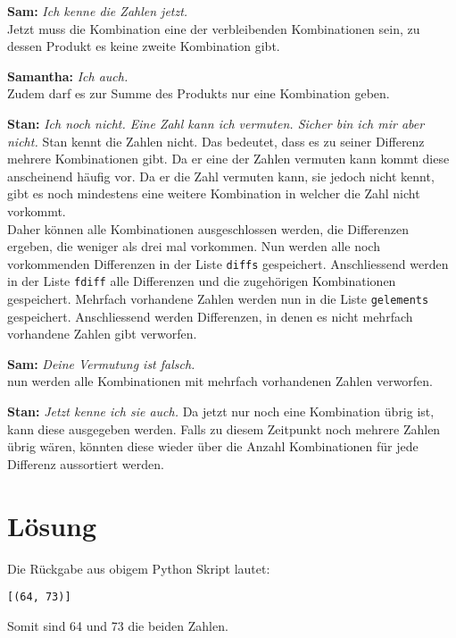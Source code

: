 \documentclass[a4paper, 10pt, fleqn]{article}
\begin{document}
\textbf{Sam: }\emph{Ich kenne die Zahlen jetzt. } \\
Jetzt muss die Kombination eine der verbleibenden Kombinationen sein, zu dessen 
Produkt es keine zweite Kombination gibt. 


\textbf{Samantha: }\emph{Ich auch. } \\
Zudem darf es zur Summe des Produkts nur eine Kombination geben. 


\textbf{Stan: }\emph{Ich noch nicht. Eine Zahl kann ich vermuten. 
Sicher bin ich mir aber nicht.}
Stan kennt die Zahlen nicht. Das bedeutet, dass es zu seiner Differenz mehrere 
Kombinationen gibt. Da er eine der Zahlen vermuten kann kommt diese anscheinend 
häufig vor. Da er die Zahl vermuten kann, sie jedoch nicht kennt, gibt es noch 
mindestens eine weitere Kombination in welcher die Zahl nicht vorkommt. \\
Daher können alle Kombinationen ausgeschlossen werden, die Differenzen ergeben, 
die weniger als drei mal vorkommen. Nun werden alle noch vorkommenden 
Differenzen in der Liste \verb?diffs? gespeichert. Anschliessend werden in der 
Liste \verb?fdiff? alle Differenzen und die zugehörigen Kombinationen 
gespeichert. Mehrfach vorhandene Zahlen werden nun in die Liste 
\verb?gelements? gespeichert. Anschliessend werden Differenzen, in denen es 
nicht mehrfach vorhandene Zahlen gibt verworfen. 


\textbf{Sam: }\emph{Deine Vermutung ist falsch. } \\
nun werden alle Kombinationen mit mehrfach vorhandenen Zahlen verworfen. 


\textbf{Stan: }\emph{Jetzt kenne ich sie auch. }
Da jetzt nur noch eine Kombination übrig ist, kann diese ausgegeben werden. 
Falls zu diesem Zeitpunkt noch mehrere Zahlen übrig wären, könnten diese wieder 
über die Anzahl Kombinationen für jede Differenz aussortiert werden. 


\section{Lösung}
Die Rückgabe aus obigem Python Skript lautet: 
\begin{lstlisting}
[(64, 73)]
\end{lstlisting}
Somit sind 64 und 73 die beiden Zahlen. 
\end{document}
